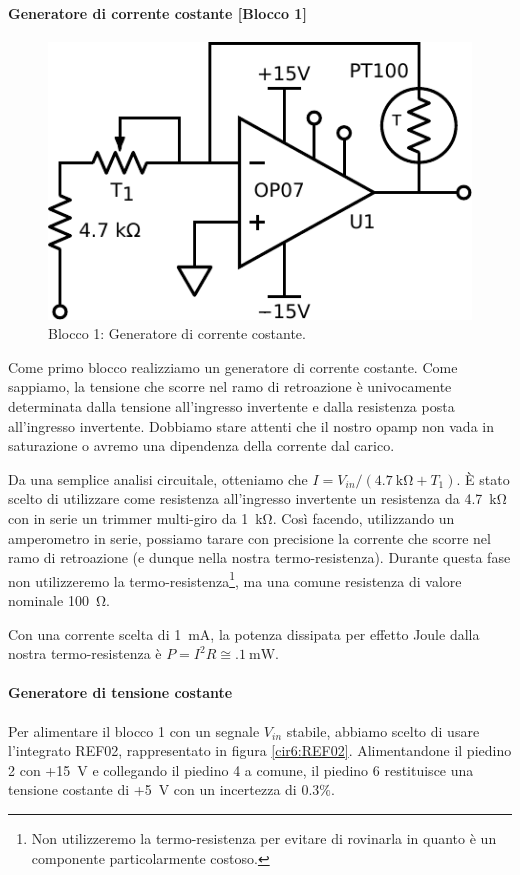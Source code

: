 \paragraph{Generatore di corrente costante [Blocco 1]\newline}

\begin{figure}
\centering
\includegraphics[width=.3\textwidth]{../E06/latex/P1.pdf}
\caption{Blocco 1: Generatore di corrente costante.}
\label{cir6:blocco1}
\end{figure}

Come primo blocco realizziamo un generatore di corrente costante.
Come sappiamo, la tensione che scorre nel ramo di retroazione è univocamente determinata dalla tensione all'ingresso invertente e dalla resistenza posta all'ingresso invertente.
Dobbiamo stare attenti che il nostro opamp non vada in saturazione o avremo una dipendenza della corrente dal carico.

Da una semplice analisi circuitale, otteniamo che $I=V_{in}/(\SI{4.7}{\kohm}+T_1)$.
È stato scelto di utilizzare come resistenza all'ingresso invertente un resistenza da \SI{4.7}{\kilo\ohm} con in serie un trimmer multi-giro da \SI{1}{\kilo\ohm}.
Così facendo, utilizzando un amperometro in serie, possiamo tarare con precisione la corrente che scorre nel ramo di retroazione (e dunque nella nostra termo-resistenza).
Durante questa fase non utilizzeremo la termo-resistenza\footnote{Non utilizzeremo la termo-resistenza per evitare di rovinarla in quanto è un componente particolarmente costoso.}, ma una comune resistenza di valore nominale \SI{100}{\ohm}.

Con una corrente scelta di \SI{1}{\milli\ampere}, la potenza dissipata per effetto Joule dalla nostra termo-resistenza è $P=I^2 R \cong \SI{.1}{\mW}$.

\paragraph{Generatore di tensione costante\newline}

Per alimentare il blocco 1 con un segnale $V_{in}$ stabile, abbiamo scelto di usare l'integrato REF02, rappresentato in figura \ref{cir6:REF02}.
Alimentandone il piedino 2 con +\SI{15}{\volt} e collegando il piedino 4 a comune, il piedino 6 restituisce una tensione costante di +\SI{5}{\volt} con un incertezza di \num{0.3}$\%$.
\newpage

